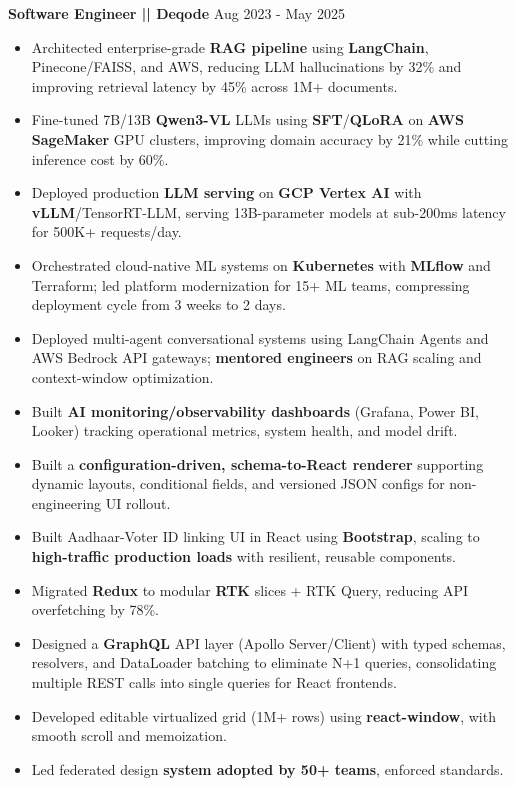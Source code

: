 \documentclass[a4paper]{article}
\begin{document}
\vspace{4pt}
\textbf{Software Engineer || Deqode}
\hfill Aug 2023 - May 2025
\begin{itemize}
\vspace{1pt}
\item {Architected enterprise-grade \textbf{RAG pipeline} using \textbf{LangChain}, Pinecone/FAISS, and AWS, reducing LLM hallucinations by 32\% and improving retrieval latency by 45\% across 1M+ documents.}
\item {Fine-tuned 7B/13B \textbf{Qwen3-VL} LLMs using \textbf{SFT}/\textbf{QLoRA} on \textbf{AWS SageMaker} GPU clusters, improving domain accuracy by 21\% while cutting inference cost by 60\%.}
\item {Deployed production \textbf{LLM serving} on \textbf{GCP Vertex AI} with \textbf{vLLM}/TensorRT-LLM, serving 13B-parameter models at sub-200ms latency for 500K+ requests/day.}
\item {Orchestrated cloud-native ML systems on \textbf{Kubernetes} with \textbf{MLflow} and Terraform; led platform modernization for 15+ ML teams, compressing deployment cycle from 3 weeks to 2 days.}
\item {Deployed multi-agent conversational systems using LangChain Agents and AWS Bedrock API gateways; \textbf{mentored engineers} on RAG scaling and context-window optimization.}
\item {Built \textbf{AI monitoring/observability dashboards} (Grafana, Power BI, Looker) tracking operational metrics, system health, and model drift.}
\item {Built a \textbf{configuration-driven, schema-to-React renderer} supporting dynamic layouts, conditional fields, and versioned JSON configs for non-engineering UI rollout.}
\item {Built Aadhaar-Voter ID linking UI in React using \textbf{Bootstrap}, scaling to \textbf{high-traffic production loads} with resilient, reusable components.}
\item {Migrated \textbf{Redux} to modular \textbf{RTK} slices + RTK Query, reducing API overfetching by 78\%.}
\item {Designed a \textbf{GraphQL} API layer (Apollo Server/Client) with typed schemas, resolvers, and DataLoader batching to eliminate N+1 queries, consolidating multiple REST calls into single queries for React frontends.}
\item {Developed editable virtualized grid (1M+ rows) using \textbf{react-window}, with smooth scroll and memoization.}
\item {Led federated design \textbf{system adopted by 50+ teams}, enforced standards.}

\end{itemize}
\end{document}
